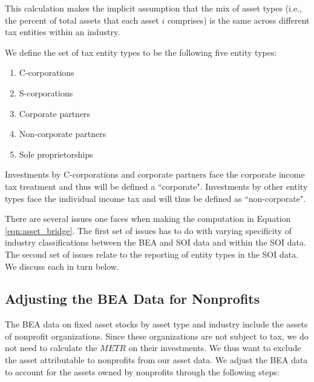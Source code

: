 \documentclass[article,11pt,letterpaper,fleqn]{article}
\theoremstyle{definition}
\numberwithin{equation}{section}
\begin{document}
\noindent\noindent This calculation makes the implicit assumption that the mix of asset types (i.e., the percent of total assets that each asset $i$ comprises) is the same across different tax entities within an industry.  

We define the set of tax entity types to be the following five entity types:
\begin{enumerate}
\item C-corporations
\item S-corporations
\item Corporate partners
\item Non-corporate partners
\item Sole proprietorships
\end{enumerate}

Investments by C-corporations and corporate partners face the corporate income tax treatment and thus will be defined a ``corporate".  Investments by other entity types face the individual income tax and will thus be defined as ``non-corporate".

There are several issues one faces when making the computation in Equation \ref{eqn:asset_bridge}.  The first set of issues has to do with varying specificity of industry classifications between the BEA and SOI data and within the SOI data.  The second set of issues relate to the reporting of entity types in the SOI data.  We discuss each in turn below.

\subsection{Adjusting the BEA Data for Nonprofits}
The BEA data on fixed asset stocks by asset type and industry include the assets of nonprofit organizations. Since these organizations are not subject to tax, we do not need to calculate the $METR$ on their investments.  We thus want to exclude the asset attributable to nonprofits from our asset data.  We adjust the BEA data to account for the assets owned by nonprofits through the following steps:
\end{document}
